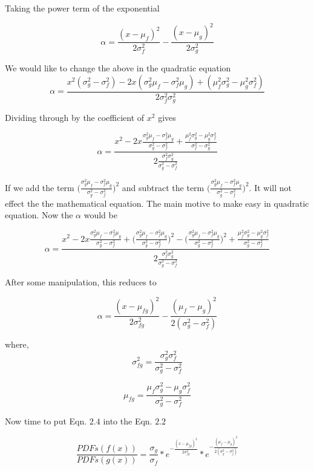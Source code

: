 Taking the power term of the exponential  

$$\alpha = \frac{(x-\mu_f)^2}{2\sigma_f^2} - \frac{(x-\mu_g)^2}{2\sigma_g^2} $$

We would like to change the above in the quadratic equation
$$\alpha = \frac{x^2(\sigma_g^2-\sigma_f^2) -2x(\sigma_g^2\mu_f-\sigma_f^2\mu_g) + (\mu_f^2\sigma_g^2 - \mu_g^2\sigma_f^2) }{2\sigma_f^2\sigma_g^2} $$

Dividing through by the coefficient of $x^2$ gives

\begin{equation}
 \alpha =  \frac{x^2 - 2x\frac{\sigma_g^2\mu_f-\sigma_f^2\mu_g}{\sigma_g^2-\sigma_f^2} + \frac{\mu_f^2\sigma_g^2 - \mu_g^2\sigma_f^2}{\sigma_f^2 - \sigma_g^2}}{2 \frac{\sigma_f^2\sigma_g^2}{\sigma_g^2 - \sigma_f^2}}  
\end{equation}


 If we add the term $\Bigg(\frac{\sigma_g^2\mu_f-\sigma_f^2\mu_g}{\sigma_g^2-\sigma_f^2}\Bigg)^2$ and subtract the term $\Bigg(\frac{\sigma_g^2\mu_f-\sigma_f^2\mu_g}{\sigma_g^2-\sigma_f^2}\Bigg)^2$. It will not effect the the mathematical equation. The main motive to make easy in quadratic equation.
 Now the $\alpha$ would be
 
 $$\alpha = \frac{x^2 - 2x\frac{\sigma_g^2\mu_f-\sigma_f^2\mu_g}{\sigma_g^2-\sigma_f^2} + \Bigg(\frac{\sigma_g^2\mu_f-\sigma_f^2\mu_g}{\sigma_g^2-\sigma_f^2}\Bigg)^2 - \Bigg(\frac{\sigma_g^2\mu_f-\sigma_f^2\mu_g}{\sigma_g^2-\sigma_f^2}\Bigg)^2  +\frac{\mu_f^2\sigma_g^2 - \mu_g^2\sigma_f^2}{\sigma_g^2 - \sigma_f^2}}{2 \frac{\sigma_f^2\sigma_g^2}{\sigma_g^2-\sigma_f^2}} $$
 
 After some manipulation, this reduces to 
 
 
\begin{equation}
    \alpha = \frac{(x-\mu_{fg})^2}{2\sigma_{fg}^2} - \frac{(\mu_f - \mu_g)^2}{2(\sigma_g^2 - \sigma_f^2)}
\end{equation}

where, 
$$\sigma_{fg}^2 = \frac{\sigma_g^2 \sigma_f^2}{\sigma_g^2 - \sigma_f^2}$$


$$\mu_{fg} = \frac{\mu_f\sigma_g^2 - \mu_g \sigma_f^2 }{\sigma_g^2 - \sigma_f^2}$$

Now time to put Eqn. $2.4$ into the Eqn. $2.2$


$$\frac{PDFs(f(x))}{PDFs(g(x))}  =  \frac{\sigma_g}{\sigma_f} *  e^{-\frac{(x-\mu_{fg})^2}{2\sigma_{fg}^2}} *  e^{-\frac{(\mu_f-\mu_g)^2}{2(\sigma_g^2 - \sigma_f^2)}}$$

